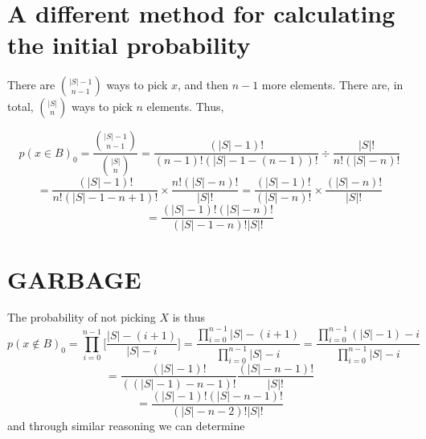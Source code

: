 \documentclass[10pt,a4paper]{article}
\begin{document}
\section*{A different method for calculating the initial probability}

There are $|S|-1 \choose n-1$ ways to pick $x$, and then $n-1$ more elements. There are, in total, $|S| \choose n$ ways to pick $n$ elements. Thus,

$$p(x \in B)_0
	= 
	\frac{
			{|S| - 1 \choose n-1}
		}{
			{|S| \choose n}
		}
= 	
		\frac{(|S|-1)!}{(n-1)!(|S|-1 - (n-1))!}
	\div
		\frac{|S|!}{n!(|S|-n)!}
$$
$$=	
		\frac{(|S|-1)!}{n!(|S|-1 - n + 1)!}
	\times
		\frac{n!(|S|-n)!}{|S|!}
=
		\frac{(|S|-1)!}{(|S| - n)!}
	\times
		\frac{(|S|-n)!}{|S|!}
$$
$$=
	\frac{
		(|S|-1)! (|S|-n)!
	}{
		(|S|-1 - n)! |S|!
	}
$$

\section*{GARBAGE}
The probability of not picking $X$ is thus
$$p(x \not \in B)_0 = \prod_{i=0}^{n-1} \bigg[ \frac{|S|-(i + 1)}{|S| - i} \bigg]
= \frac{\prod_{i=0}^{n-1} |S|- (i+1)}{\prod_{i=0}^{n-1} |S| - i}
= \frac{\prod_{i=0}^{n-1} (|S|-1)-i}{\prod_{i=0}^{n-1} |S| - i}$$
$$= \frac{(|S|-1)!}{((|S| - 1) - n - 1)!} \frac{(|S| - n - 1)!}{|S|!}$$
$$= \frac{(|S|-1)!(|S| - n - 1)!}{(|S| - n - 2)!|S|!}$$
and through similar reasoning we can determine
\end{document}
